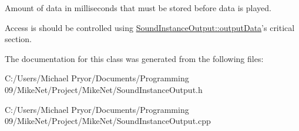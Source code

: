Amount of data in milliseconds that must be stored before data is played. 

Access is should be controlled using \hyperlink{class_sound_instance_output_ad8422553602e12785eab486a27796da3}{SoundInstanceOutput::outputData}'s critical section. 

The documentation for this class was generated from the following files:\begin{DoxyCompactItemize}
\item 
C:/Users/Michael Pryor/Documents/Programming 09/MikeNet/Project/MikeNet/SoundInstanceOutput.h\item 
C:/Users/Michael Pryor/Documents/Programming 09/MikeNet/Project/MikeNet/SoundInstanceOutput.cpp\end{DoxyCompactItemize}
